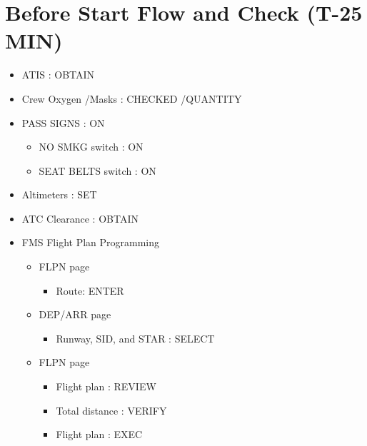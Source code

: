 \chapter{Before Start Flow and Check (T-25 MIN)}
\label{beforestartflowandcheckt-25min}

\begin{itemize}
\item ATIS : OBTAIN

\item Crew Oxygen \slash  Masks : CHECKED \slash  QUANTITY

\item PASS SIGNS : ON

\begin{itemize}
\item NO SMKG switch : ON

\item SEAT BELTS switch : ON

\end{itemize}

\item Altimeters : SET

\item ATC Clearance : OBTAIN

\item FMS Flight Plan Programming

\begin{itemize}
\item FLPN page

\begin{itemize}
\item Route: ENTER

\end{itemize}

\item DEP\slash ARR page

\begin{itemize}
\item Runway, SID, and STAR : SELECT

\end{itemize}

\item FLPN page

\begin{itemize}
\item Flight plan : REVIEW

\item Total distance : VERIFY

\item Flight plan : EXEC


\end{itemize}
\end{itemize}
\end{itemize}
